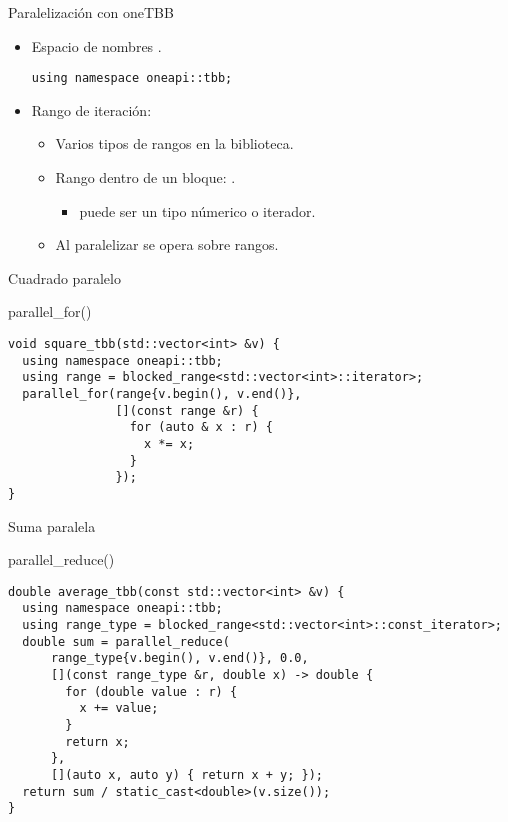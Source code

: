 \begin{frame}[t,fragile]{Paralelización con oneTBB}
\begin{itemize}
  \item Espacio de nombres .
\begin{lstlisting}
using namespace oneapi::tbb;
\end{lstlisting}

  \item Rango de iteración:
    \begin{itemize}
      \item Varios tipos de rangos en la biblioteca.
      \item Rango dentro de un bloque: .
        \begin{itemize}
          \item {} puede ser un tipo númerico o iterador.
        \end{itemize}
      \item Al paralelizar se opera sobre rangos.
    \end{itemize}
\end{itemize}
\end{frame}

\begin{frame}[t,fragile]{Cuadrado paralelo}
\begin{block}{parallel\_for()}
\begin{lstlisting}
void square_tbb(std::vector<int> &v) {
  using namespace oneapi::tbb;
  using range = blocked_range<std::vector<int>::iterator>;
  parallel_for(range{v.begin(), v.end()},
               [](const range &r) {
                 for (auto & x : r) {
                   x *= x;
                 }
               });
}
\end{lstlisting}
\end{block}
\end{frame}

\begin{frame}[t,fragile]{Suma paralela}
\begin{block}{parallel\_reduce()}
\begin{lstlisting}
double average_tbb(const std::vector<int> &v) {
  using namespace oneapi::tbb;
  using range_type = blocked_range<std::vector<int>::const_iterator>;
  double sum = parallel_reduce(
      range_type{v.begin(), v.end()}, 0.0,
      [](const range_type &r, double x) -> double {
        for (double value : r) {
          x += value;
        }
        return x;
      },
      [](auto x, auto y) { return x + y; });
  return sum / static_cast<double>(v.size());
}
\end{lstlisting}
\end{block}
\end{frame}

